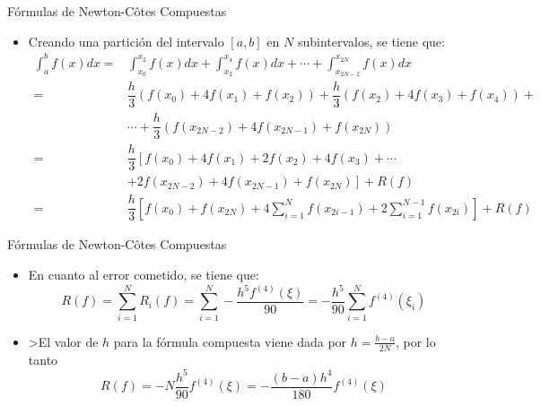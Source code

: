\documentclass[12pt]{beamer}
\begin{document}
\begin{frame}{F\'ormulas de Newton-C\^otes Compuestas}
  \begin{itemize}
    \item Creando una partici\'on del intervalo $[a,b]$ en $N$ subintervalos, se tiene que:
    {\footnotesize
    \begin{align*}
      \int_{a}^{b}f(x)dx = &  \int_{x_0}^{x_2}f(x)dx + \int_{x_2}^{x_4}f(x)dx + \cdots + \int_{x_{2N-2}}^{x_{2N}}f(x)dx\\      
      = & \dfrac{h}{3}\left(f(x_0)+4f(x_1)+f(x_2)\right)+\dfrac{h}{3}\left(f(x_2)+4f(x_3)+f(x_4)\right)+\\
      & \cdots+\dfrac{h}{3}\left(f(x_{2N-2})+4f(x_{2N-1})+f(x_{2N})\right)\\
      = & \dfrac{h}{3}\left[f(x_0)+4f(x_1)+2f(x_2)+4f(x_3)+\cdots\right.\\
      & +\left.2f(x_{2N-2})+4f(x_{2N-1})+f(x_{2N})\right]+R(f)\\
      = & \dfrac{h}{3}\left[f(x_0)+f(x_{2N})+4\sum_{i=1}^{N}f(x_{2i-1})+2\sum_{i=1}^{N-1}f(x_{2i})\right]+R(f)
    \end{align*}}
  \end{itemize}
\end{frame}
\begin{frame}{F\'ormulas de Newton-C\^otes Compuestas}
  \begin{itemize}
    \item En cuanto al error cometido, se tiene que:
    $$
    R(f) = \sum_{i=1}^{N}R_i(f) = \sum_{i=1}^{N}-\dfrac{h^5f^{(4)}(\xi)}{90}=-\dfrac{h^5}{90}\sum_{i=1}^{N}f^{(4)}(\xi_i)
    $$
    \item<2-> >El valor de $h$ para la f\'ormula compuesta viene dada por $h=\frac{b-a}{2N}$, por lo tanto
    $$
    R(f) = -N \dfrac{h^5}{90}f^{(4)}(\xi) = -\dfrac{(b-a)h^4}{180}f^{(4)}(\xi)
    $$ 
  \end{itemize}
\end{frame}
\end{document}
